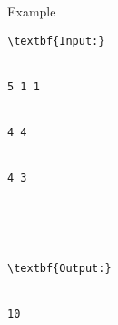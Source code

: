 Example
\begin{verbatim}
\textbf{Input:}


5 1 1


4 4


4 3





\textbf{Output:}


10


\end{verbatim}
